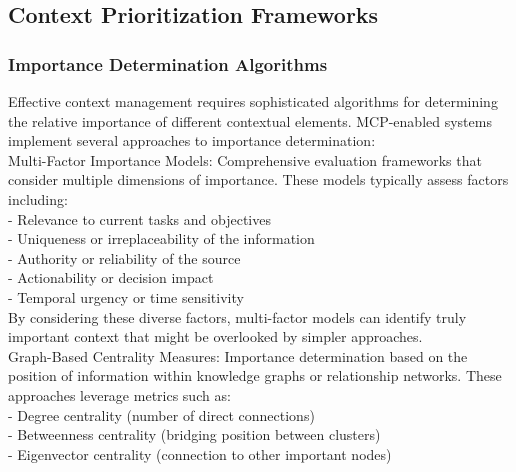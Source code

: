 \subsection{Context Prioritization Frameworks}
\subsubsection{Importance Determination Algorithms}
Effective context management requires sophisticated algorithms for determining the relative importance of different contextual elements. MCP-enabled systems implement several approaches to importance determination:\\ \newline
Multi-Factor Importance Models: Comprehensive evaluation frameworks that consider multiple dimensions of importance. These models typically assess factors including:\\ \newline
- Relevance to current tasks and objectives\\ \newline
- Uniqueness or irreplaceability of the information\\ \newline
- Authority or reliability of the source\\ \newline
- Actionability or decision impact\\ \newline
- Temporal urgency or time sensitivity\\ \newline
By considering these diverse factors, multi-factor models can identify truly important context that might be overlooked by simpler approaches.\\ \newline
Graph-Based Centrality Measures: Importance determination based on the position of information within knowledge graphs or relationship networks. These approaches leverage metrics such as:\\ \newline
- Degree centrality (number of direct connections)\\ \newline
- Betweenness centrality (bridging position between clusters)\\ \newline
- Eigenvector centrality (connection to other important nodes)\\ \newline
